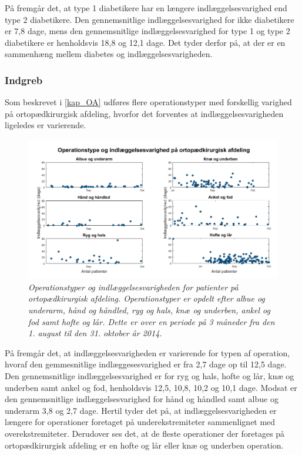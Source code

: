 \noindent
På  fremgår det, at type 1 diabetikere har en længere indlæggelsesvarighed end type 2 diabetikere. Den gennemsnitlige indlæggelsesvarighed for ikke diabetikere er 7,8 dage, mens den gennemsnitlige indlæggelsesvarighed for type 1 og type 2 diabetikere er henholdsvis 18,8 og 12,1 dage. Det tyder derfor på, at der er en sammenhæng mellem diabetes og indlæggelsesvarigheden. 


\subsubsection{Indgreb}
Som beskrevet i \ref{kap_OA} udføres flere operationstyper med forskellig varighed på ortopædkirurgisk afdeling, hvorfor det forventes at indlæggelsesvarigheden ligeledes er varierende. 


\begin{figure}[H]
	\centering
	\includegraphics[scale=0.5]{figures/operaogindlaeg}
	\caption{\textit{Operationstyper og indlæggelsesvarigheden for patienter på ortopædkirurgisk afdeling. Operationstyper er opdelt efter albue og underarm, hånd og håndled, ryg og hals, knæ og underben, ankel og fod samt hofte og lår. Dette er over en periode på 3 måneder fra den 1. august til den 31. oktober år 2014.}}
	\label{opvsindlaegtid}
\end{figure}


\noindent
På  fremgår det, at indlæggelsesvarigheden er varierende for typen af operation, hvoraf den gemmesnitlige indlæggesesvarighed er fra 2,7 dage op til 12,5 dage.  Den gennemsnitlige  indlæggelsesvarighed er for ryg og hals, hofte og lår, knæ og underben samt ankel og fod, henholdsvis 12,5, 10,8, 10,2 og 10,1 dage. Modsat er den gennemsnitlige indlæggelsesvarighed for hånd og håndled samt albue og underarm 3,8 og 2,7 dage. Hertil tyder det på, at indlæggelsesvarigheden er længere for operationer foretaget på underekstremiteter sammenlignet med overekstremiteter. Derudover ses det, at de fleste operationer der foretages på ortopædkirurgisk afdeling er en hofte og lår eller knæ og underben operation. 


